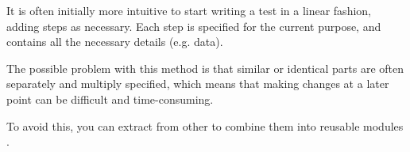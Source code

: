 
It is often initially more intuitive to start writing a test in a linear fashion, adding steps as necessary. Each step is specified for the current purpose, and contains all the necessary details (e.g. data). 

The possible problem with this method is that similar or identical parts are 
often separately and multiply specified, which means that making 
changes at a later point
can be difficult and time-consuming.

To avoid this, you can extract \gdcases{} from other \gdcases{} to combine them into reusable modules . 

